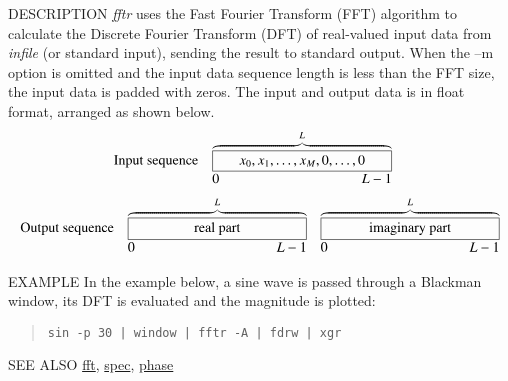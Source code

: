 \begin{synopsis}
 \item[fftr] [ --l $L$ ] [ --m $M$] [ --\{ A $|$ R $|$ I $|$ P \} ] [ --H ]
             [ {\em infile} ] 
\end{synopsis}

\begin{qsection}{DESCRIPTION}
{\em fftr} uses the Fast Fourier Transform (FFT) algorithm 
to calculate the Discrete Fourier Transform (DFT) 
of real-valued input data from {\em infile} (or standard input), 
sending the result to standard output. 
When the --m option is omitted 
and the input data sequence length is less than the FFT size, 
the input data is padded with zeros.
The input and output data is in float format, 
arranged as shown below.
\begin{displaymath}
\begin{array}{lll}
\mbox{Input sequence} & 
\overbrace{\framebox[4.5cm]{$x_0, x_1, \ldots, x_{M}, 0,
                                        \ldots,0$}}^{L}  & \\
                & \makebox[4.5cm]{0\hfill $L-1$} &
\end{array}
\end{displaymath}
\begin{displaymath}
\begin{array}{lll}
\mbox{Output sequence} & \overbrace{\framebox[4.5cm]{real part}}^{L} &
           \overbrace{\framebox[4.5cm]{imaginary part}}^{L} \\
                & \makebox[4.5cm]{0\hfill $L-1$} &
                \makebox[4.5cm]{0\hfill $L-1$}
\end{array}
\end{displaymath}
\end{qsection}

\begin{options}
\end{options}

\begin{qsection}{EXAMPLE}
In the example below, a sine wave is passed through a Blackman window,
its DFT is evaluated and the magnitude is plotted:
\begin{quote}
  \verb!sin -p 30 | window | fftr -A | fdrw | xgr!
\end{quote}

\end{qsection}

\begin{qsection}{SEE ALSO}
\hyperlink{fft}{fft},
\hyperlink{spec}{spec},
\hyperlink{phase}{phase}
\end{qsection}

